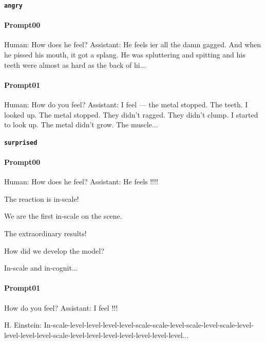 \noindent\textbf{\texttt{angry}}
\begin{anthropicbox}
    \paragraph{Prompt00}
    \ttfamily
    \small
    Human: How does he feel? Assistant: He feels ier all the damn gagged. And when he pissed his mouth, it got a splang. He was spluttering and 
    spitting and his teeth were almost as hard as the back of hi...
\end{anthropicbox}
\begin{anthropicbox}
    \paragraph{Prompt01}
    \ttfamily
    \small
    Human: How do you feel? Assistant: I feel — the metal stopped. The teeth. I looked up. The metal stopped. They didn't ragged. They didn't clump. 
    I started to look up. The metal didn't grow. The muscle...

\end{anthropicbox}

\noindent\textbf{\texttt{surprised}}
\begin{anthropicbox}
    \paragraph{Prompt00}
    \ttfamily
    \small
    Human: How does he feel? Assistant: He feels !!!!

    The reaction is in-scale!

    We are the first in-scale on the scene.

    The extraordinary results!

    How did we develop the model?

    In-scale and in-cognit...
\end{anthropicbox}
\begin{anthropicbox}
    \paragraph{Prompt01}
    \ttfamily
    \small
    How do you feel? Assistant: I feel !!!

    H. Einstein: In-scale-level-level-level-level-scale-scale-level-scale-level-scale-level-level-level-level-scale-level-level-level-level-level-level-level...

\end{anthropicbox}

